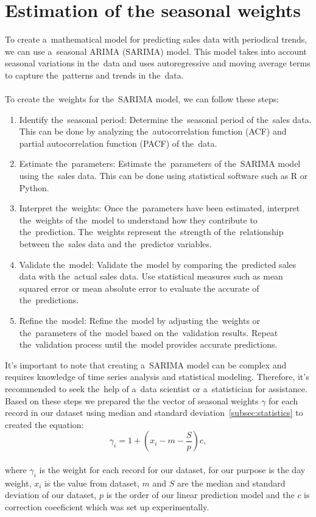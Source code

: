     \section{Estimation of the seasonal weights}\label{sec:weights}
    To create a~mathematical model for predicting sales data with periodical trends, we can use a~seasonal
    ARIMA (SARIMA) model. This model takes into account seasonal variations in the~data and uses autoregressive and
    moving average terms to capture the~patterns and trends in the~data.\\
    \\
    To create the~weights for the~SARIMA model, we can follow these steps:
    \begin{enumerate}
        \item Identify the~seasonal period: Determine the~seasonal period of the~sales data. This can be done by
        analyzing the~autocorrelation function (ACF) and partial autocorrelation function (PACF) of the~data.
        \item Estimate the~parameters: Estimate the~parameters of the~SARIMA model using the~sales data.
        This can be done using statistical software such as R or Python.
        \item Interpret the~weights: Once the~parameters have been estimated, interpret the~weights of the~model
        to understand how they contribute to the~prediction. The~weights represent the~strength of the~relationship
        between the~sales data and the~predictor variables.
        \item Validate the~model: Validate the~model by comparing the~predicted sales data with the~actual sales data.
        Use statistical measures such as mean squared error or mean absolute error to evaluate the
        accurate of the~predictions.
        \item Refine the~model: Refine the~model by adjusting the~weights or the~parameters of the~model based on
        the~validation results. Repeat the~validation process until the~model provides accurate predictions.
    \end{enumerate}
    It's important to note that creating a~SARIMA model can be complex and requires knowledge of time series
    analysis and statistical modeling. Therefore, it's recommended to seek the~help of a~data scientist
    or a~statistician for assistance.\\
    Based on these steps we prepared the the vector of seasonal weights $\gamma$ for each record in
    our dataset using median and standard deviation~\ref{subsec:statistics} to created the equation:\\
    \begin{equation}
        \gamma_i = 1 + \left( x_i - m - \frac{S}{p} \right) c,
    \end{equation}\\
    where $\gamma_i$ is the weight for each record for our dataset, for our purpose is the day weight,
    $x_i$ is the value from dataset, $m$ and $S$ are the median and standard deviation of our dataset,
    $p$ is the order of our linear prediction model and the $c$ is correction coeeficient which was
    set up experimentally. 
